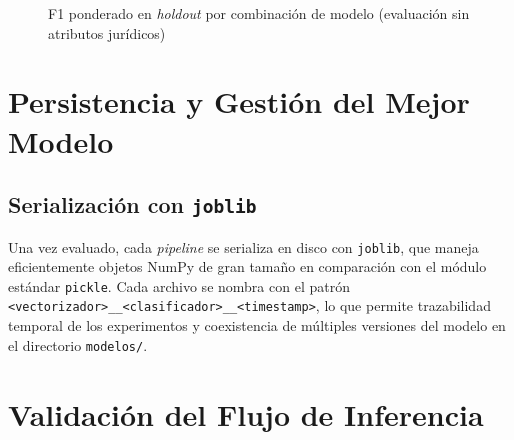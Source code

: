\begin{figure}[H]
\caption{F1 ponderado en \textit{holdout} por combinación de modelo
(evaluación sin atributos jurídicos)}
\label{fig:f1_comparacion}
\end{figure}

\section{Persistencia y Gestión del Mejor Modelo}
\label{sec:persistencia}

\subsection{Serialización con \texttt{joblib}}
\label{subsec:serializacion}

Una vez evaluado, cada \textit{pipeline} se serializa en disco con
\texttt{joblib}, que maneja eficientemente objetos NumPy de gran tamaño
en comparación con el módulo estándar \texttt{pickle}. Cada archivo se
nombra con el patrón
\texttt{<vectorizador>\_\_<clasificador>\_\_<timestamp>}, lo que permite
trazabilidad temporal de los experimentos y coexistencia de múltiples
versiones del modelo en el directorio \texttt{modelos/}.

\section{Validación del Flujo de Inferencia}
\label{sec:inferencia}

